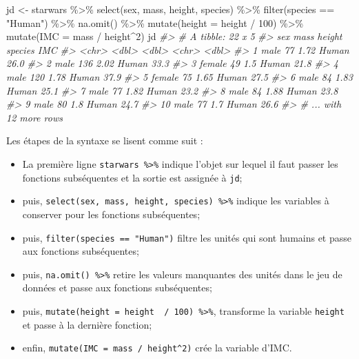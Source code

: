 \documentclass[
]{book}
\newenvironment{Shaded}{}{}
\newcommand{\AttributeTok}[1]{#1}
\newcommand{\CommentTok}[1]{\textit{#1}}
\newcommand{\DecValTok}[1]{#1}
\newcommand{\FunctionTok}[1]{#1}
\newcommand{\NormalTok}[1]{#1}
\newcommand{\OtherTok}[1]{#1}
\newcommand{\SpecialCharTok}[1]{#1}
\newcommand{\StringTok}[1]{#1}
\begin{document}
\begin{Shaded}
\begin{Highlighting}[]
\NormalTok{jd }\OtherTok{\textless{}{-}}\NormalTok{  starwars }\SpecialCharTok{\%\textgreater{}\%} 
  \FunctionTok{select}\NormalTok{(sex, mass, height, species) }\SpecialCharTok{\%\textgreater{}\%} 
  \FunctionTok{filter}\NormalTok{(species }\SpecialCharTok{==} \StringTok{"Human"}\NormalTok{) }\SpecialCharTok{\%\textgreater{}\%} 
  \FunctionTok{na.omit}\NormalTok{() }\SpecialCharTok{\%\textgreater{}\%} 
  \FunctionTok{mutate}\NormalTok{(}\AttributeTok{height =}\NormalTok{ height  }\SpecialCharTok{/} \DecValTok{100}\NormalTok{) }\SpecialCharTok{\%\textgreater{}\%} 
  \FunctionTok{mutate}\NormalTok{(}\AttributeTok{IMC =}\NormalTok{ mass }\SpecialCharTok{/}\NormalTok{ height}\SpecialCharTok{\^{}}\DecValTok{2}\NormalTok{)  }
\NormalTok{jd}
\CommentTok{\#\textgreater{} \# A tibble: 22 x 5}
\CommentTok{\#\textgreater{}    sex     mass height species   IMC}
\CommentTok{\#\textgreater{}    \textless{}chr\textgreater{}  \textless{}dbl\textgreater{}  \textless{}dbl\textgreater{} \textless{}chr\textgreater{}   \textless{}dbl\textgreater{}}
\CommentTok{\#\textgreater{}  1 male      77   1.72 Human    26.0}
\CommentTok{\#\textgreater{}  2 male     136   2.02 Human    33.3}
\CommentTok{\#\textgreater{}  3 female    49   1.5  Human    21.8}
\CommentTok{\#\textgreater{}  4 male     120   1.78 Human    37.9}
\CommentTok{\#\textgreater{}  5 female    75   1.65 Human    27.5}
\CommentTok{\#\textgreater{}  6 male      84   1.83 Human    25.1}
\CommentTok{\#\textgreater{}  7 male      77   1.82 Human    23.2}
\CommentTok{\#\textgreater{}  8 male      84   1.88 Human    23.8}
\CommentTok{\#\textgreater{}  9 male      80   1.8  Human    24.7}
\CommentTok{\#\textgreater{} 10 male      77   1.7  Human    26.6}
\CommentTok{\#\textgreater{} \# ... with 12 more rows}
\end{Highlighting}
\end{Shaded}

Les étapes de la syntaxe se lisent comme suit :

\begin{itemize}
\item
  La première ligne \texttt{starwars\ \%\textgreater{}\%} indique l'objet sur lequel il faut passer les fonctions subséquentes et la sortie est assignée à \texttt{jd};
\item
  puis, \texttt{select(sex,\ mass,\ height,\ species)\ \%\textgreater{}\%} indique les variables à conserver pour les fonctions subséquentes;
\item
  puis, \texttt{filter(species\ ==\ "Human")} filtre les unités qui sont humains et passe aux fonctions subséquentes;
\item
  puis, \texttt{na.omit()\ \%\textgreater{}\%} retire les valeurs manquantes des unités dans le jeu de données et passe aux fonctions subséquentes;
\item
  puis, \texttt{mutate(height\ =\ height\ \ /\ 100)\ \%\textgreater{}\%}, transforme la variable \texttt{height} et passe à la dernière fonction;
\item
  enfin, \texttt{mutate(IMC\ =\ mass\ /\ height\^{}2)} crée la variable d'IMC.
\end{itemize}
\end{document}
